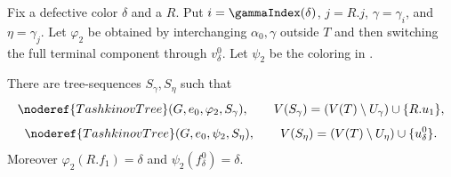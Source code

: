 \begin{helper}
Fix a defective color $\delta$ and a
 $R$.  Put
$i=\gammaIndex(\delta)$, $j=R.j$, $\gamma=\gamma_i$, and
$\eta=\gamma_j$.  Let $\varphi_2$ be obtained by interchanging
$\alpha_0,\gamma$ outside $T$ and then switching the full terminal
component through $v^0_\delta$.  Let $\psi_2$ be the coloring in
.

There are tree-sequences $S_\gamma,S_\eta$ such that
\[
 \noderef{TashkinovTree}(G,e_0,\varphi_2,S_\gamma),\qquad
 V(S_\gamma)=(V(T)\setminus U_\gamma)\cup\{R.u_1\},
\]
\[
 \noderef{TashkinovTree}(G,e_0,\psi_2,S_\eta),\qquad
 V(S_\eta)=(V(T)\setminus U_\eta)\cup\{u^0_\delta\}.
\]
Moreover $\varphi_2(R.f_1)=\delta$ and
$\psi_2(f^0_\delta)=\delta$.
\end{helper}
